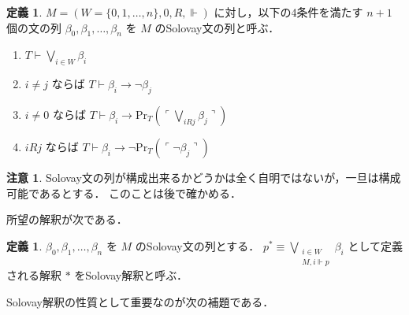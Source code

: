 \documentclass{jsarticle}
\newcommand*{\Provable}{\mathrm{Pr}}
\theoremstyle{definition}
\newtheorem{definition}[theorem]{定義}
\newtheorem{remark}[theorem]{注意}
\begin{document}
\begin{definition}
	$M = (W = \{0,1,\dots,n\}, 0, R, \Vdash)$ に対し，以下の4条件を満たす $n + 1$ 個の文の列 $\beta_0, \beta_1, \dots, \beta_n$ を $M$ のSolovay文の列と呼ぶ．
	\begin{enumerate}
		\item $T \vdash \bigvee_{i \in W} \beta_i$
		\item $i \neq j$ ならば $T \vdash \beta_i \to \lnot \beta_j$
		\item $i \neq 0$ ならば $T \vdash \beta_i \to \Provable_T(\ulcorner \bigvee_{i R j} \beta_j \urcorner)$
		\item $i R j$ ならば $T \vdash \beta_i \to \lnot \Provable_T(\ulcorner \lnot \beta_j \urcorner)$
	\end{enumerate}
\end{definition}

\begin{remark}
	Solovay文の列が構成出来るかどうかは全く自明ではないが，一旦は構成可能であるとする．
	このことは後で確かめる．
\end{remark}

所望の解釈が次である．

\begin{definition}
	$\beta_0, \beta_1, \dots, \beta_n$ を $M$ のSolovay文の列とする．
	$p^* \equiv \bigvee_{\substack{i \in W \\ M, i \Vdash p}} \beta_i$ として定義される解釈 $*$ をSolovay解釈と呼ぶ．
\end{definition}

Solovay解釈の性質として重要なのが次の補題である．
\end{document}
